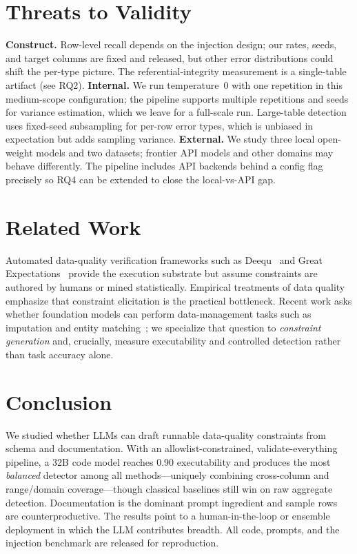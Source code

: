 \documentclass[10pt,twocolumn]{article}
\begin{document}
\section{Threats to Validity}\label{sec:threats}
\textbf{Construct.} Row-level recall depends on the injection design; our rates,
seeds, and target columns are fixed and released, but other error distributions
could shift the per-type picture. The referential-integrity measurement is a
single-table artifact (see RQ2). \textbf{Internal.} We run temperature~0 with one
repetition in this medium-scope configuration; the pipeline supports multiple
repetitions and seeds for variance estimation, which we leave for a full-scale
run. Large-table detection uses fixed-seed subsampling for per-row error types,
which is unbiased in expectation but adds sampling variance. \textbf{External.} We
study three local open-weight models and two datasets; frontier API models and
other domains may behave differently. The pipeline includes API backends behind a
config flag precisely so RQ4 can be extended to close the local-vs-API gap.

\section{Related Work}\label{sec:related}
Automated data-quality verification frameworks such as
Deequ~\cite{amazondeequ} and Great Expectations~\cite{greatexpectations} provide
the execution substrate but assume constraints are authored by humans or mined
statistically. Empirical treatments of data quality~\cite{dataqualitysurvey}
emphasize that constraint elicitation is the practical bottleneck. Recent work
asks whether foundation models can perform data-management tasks such as
imputation and entity matching~\cite{llmdataeng}; we specialize that question to
\emph{constraint generation} and, crucially, measure executability and
controlled detection rather than task accuracy alone.

\section{Conclusion}
We studied whether LLMs can draft runnable data-quality constraints from schema
and documentation. With an allowlist-constrained, validate-everything pipeline, a
32B code model reaches 0.90 executability and produces the most \emph{balanced}
detector among all methods---uniquely combining cross-column and range/domain
coverage---though classical baselines still win on raw aggregate detection.
Documentation is the dominant prompt ingredient and sample rows are
counterproductive. The results point to a human-in-the-loop or ensemble
deployment in which the LLM contributes breadth. All code, prompts, and the
injection benchmark are released for reproduction.



\end{document}
